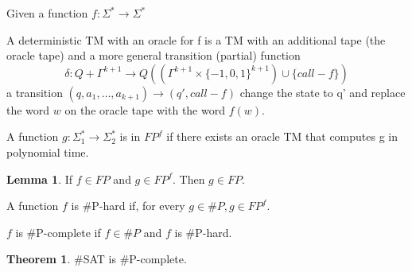 \documentclass[a4paper,12pt]{article}
\theoremstyle{definition}
\newtheorem{lemma}[counter]{Lemma}
\newtheorem{theorem}[counter]{Theorem}
\theoremstyle{remark}
\begin{document}
Given a function $f: \Sigma^* \to \Sigma^*$

A deterministic TM with an oracle for f is a TM with an additional tape (the oracle tape) and a more general transition (partial) function
\begin{equation*}
    \delta: Q + \Gamma^{k+1} \to Q((\Gamma^{k+1} \times \{-1, 0, 1\}^{k+1}) \cup \{call-f\}) %
\end{equation*}
a transition $(q, a_1, \dots, a_{k+1}) \to (q', call-f)$
change the state to q' and replace the word $w$ on the oracle tape with the word $f(w)$.

A function $g: \Sigma_1^* \to \Sigma_2^*$ is in $FP^f$ if there exists an oracle TM 
that computes g in polynomial time.

\begin{lemma}
    If $f \in FP$ and $g \in FP^f$. Then $g \in FP$.
\end{lemma}

A function $f$ is $\#$P-hard if, for every $g \in \#P, g \in FP^f$.

$f$ is $\#$P-complete if $f \in \#P$ and $f$ is $\#$P-hard.

\begin{theorem}
    $\#$SAT is $\#$P-complete.
\end{theorem}
\end{document}

